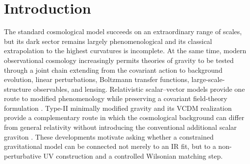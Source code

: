 \documentclass[12pt]{iopart}
\begin{document}
\begin{abstract}
The central purpose of this work is methodological as much as phenomenological: every major transition---fixed point, UV-to-IR flow, heavy-field decoupling, bounce transfer, Boltzmann implementation, chains, and held-out likelihoods---is associated with a machine-readable authority package and an independent numerical replay.  The results support an asymptotically safe Wilsonian UV-to-IR construction within the declared functional truncation; they do not constitute an all-orders proof of UV completeness.  We provide the derivations, numerical tolerances, provenance rules, failure modes, and falsifiability criteria needed for external groups to reproduce or refute the construction.
\end{abstract}

\maketitle

\section{Introduction}
\label{sec:intro}

The standard cosmological model succeeds on an extraordinary range of scales, but its dark sector remains largely phenomenological and its classical extrapolation to the highest curvatures is incomplete.  At the same time, modern observational cosmology increasingly permits theories of gravity to be tested through a joint chain extending from the covariant action to background evolution, linear perturbations, Boltzmann transfer functions, large-scale-structure observables, and lensing.  Relativistic scalar--vector models provide one route to modified phenomenology while preserving a covariant field-theory formulation \cite{SkordisZlosnik2021,SkordisZlosnik2022,BatakiSkordisZlosnik2024,RosaZlosnik2024}.  Type-II minimally modified gravity and its VCDM realization provide a complementary route in which the cosmological background can differ from general relativity without introducing the conventional additional scalar graviton \cite{DeFeliceMukohyamaPookkillath2021,DeFeliceMaedaMukohyamaPookkillath2022,GanzMartensMukohyamaNamba2023}.  These developments motivate asking whether a constrained gravitational model can be connected not merely to an IR fit, but to a non-perturbative UV construction and a controlled Wilsonian matching step.
\end{document}
